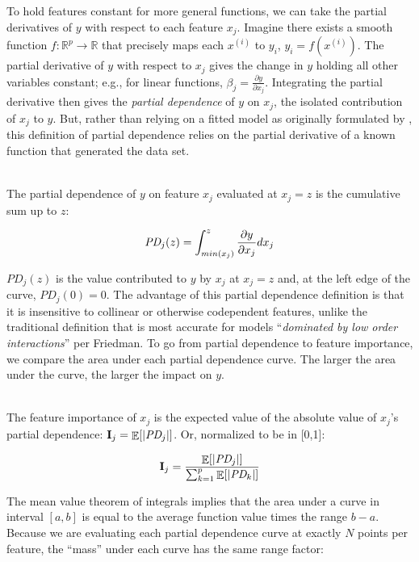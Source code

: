\documentclass[12pt]{article}
\newcommand{\todo}[1]{{{\color{red}{[#1]}}}}
\newcommand{\Ex}{\mathop{\mathbb{E}}}
\newcommand{\Imp}{\mathbf{I}}
\renewcommand{\xi}{x^{(i)}}
\begin{document}
To hold features constant for more general functions, we can take the partial derivatives of $y$ with respect to each feature $x_j$. Imagine there exists a smooth function $f:\mathbb{R}^{p} \rightarrow \mathbb{R}$ that precisely maps each $\xi$ to $y_i$, ${y_i} = f(\xi)$. \todo{should that be $y^{(i)}$ to be consistent?} The partial derivative of $y$ with respect to $x_j$ gives the change in $y$ holding all other variables constant; e.g., for linear functions, $\beta_j = \frac{\partial y}{\partial x_j}$. Integrating the partial derivative then gives the {\em partial dependence}  of $y$ on $x_j$, the isolated contribution of $x_j$ to $y$. But, rather than relying on a fitted model as originally formulated by \cite{PDP}, this definition of partial dependence relies on the partial derivative of a known function that generated the data set.

~\\
 The partial dependence of $y$ on feature $x_j$ evaluated at $x_j = z$ is the cumulative sum up to $z$:

\begin{equation}\label{eq:pd}
\text{\it PD}_j(z) = \int_{min(x_j)}^z \frac{\partial y}{\partial x_j} dx_j
\end{equation}

$PD_j(z)$ is the value contributed to $y$ by $x_j$ at $x_j = z$ and, at the left edge of the curve, $PD_j(0)=0$. The advantage of this partial dependence definition is that it is insensitive to collinear or otherwise codependent features, unlike the traditional definition that is most accurate for models ``{\em dominated by low order interactions}'' per Friedman.  To go from partial dependence to feature importance, we compare the area under each partial dependence curve. The larger the area under the curve, the larger the impact on $y$.

~\\
 The feature importance of $x_j$ is the expected value of the absolute value of $x_j$'s partial dependence: $\Imp_j = \Ex[|\text{\it PD}_j|]$. Or, normalized to be in [0,1]:

\begin{equation}\label{eq:Epd2}
\Imp_j = \frac{\Ex[|\text{\it PD}_j|]}{\sum_{k=1}^p \Ex[|\text{\it PD}_k|]}
\end{equation}

The mean value theorem of integrals implies that the area under a curve in interval $[a,b]$ is equal to the average function value times the range $b-a$.  Because we are evaluating each partial dependence curve at exactly $N$ points per feature, the ``mass'' under each curve has the same range factor:
\end{document}
